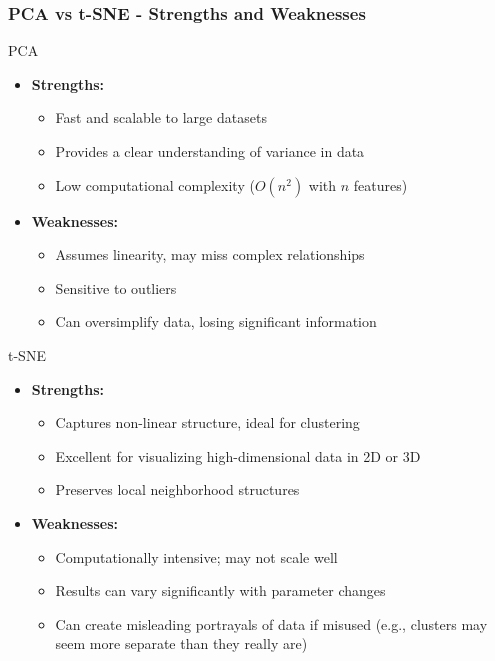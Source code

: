 \documentclass{beamer}
\begin{document}
\begin{frame}[fragile]
    \frametitle{PCA vs t-SNE - Strengths and Weaknesses}

    \begin{block}{PCA}
        \begin{itemize}
            \item \textbf{Strengths:}
                \begin{itemize}
                    \item Fast and scalable to large datasets
                    \item Provides a clear understanding of variance in data
                    \item Low computational complexity ($O(n^2)$ with $n$ features)
                \end{itemize}
            \item \textbf{Weaknesses:}
                \begin{itemize}
                    \item Assumes linearity, may miss complex relationships
                    \item Sensitive to outliers
                    \item Can oversimplify data, losing significant information
                \end{itemize}
        \end{itemize}
    \end{block}
    
    \begin{block}{t-SNE}
        \begin{itemize}
            \item \textbf{Strengths:}
                \begin{itemize}
                    \item Captures non-linear structure, ideal for clustering
                    \item Excellent for visualizing high-dimensional data in 2D or 3D
                    \item Preserves local neighborhood structures
                \end{itemize}
            \item \textbf{Weaknesses:}
                \begin{itemize}
                    \item Computationally intensive; may not scale well
                    \item Results can vary significantly with parameter changes
                    \item Can create misleading portrayals of data if misused (e.g., clusters may seem more separate than they really are)
                \end{itemize}
        \end{itemize}
    \end{block}
\end{frame}
\end{document}
